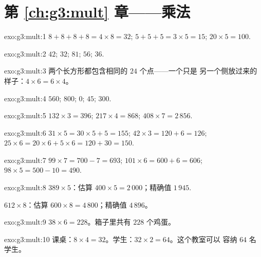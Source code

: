 \section*{第 \ref{ch:g3:mult} 章——乘法}

\begin{solution}{exo:g3:mult:1}
$8 + 8 + 8 + 8 = 4 \times 8 = 32$; \quad
$5 + 5 + 5 = 3 \times 5 = 15$; \quad
$20 \times 5 = 100$.
\end{solution}

\begin{solution}{exo:g3:mult:2}
$42$; \quad $32$; \quad $81$; \quad $56$; \quad $36$.
\end{solution}

\begin{solution}{exo:g3:mult:3}
两个长方形都包含相同的 $24$ 个点——一个只是
另一个侧放过来的样子：$4 \times 6 = 6 \times 4$。
\end{solution}

\begin{solution}{exo:g3:mult:4}
$560$; \quad $800$; \quad $0$; \quad $45$; \quad $300$.
\end{solution}

\begin{solution}{exo:g3:mult:5}
$132 \times 3 = 396$; \quad
$217 \times 4 = 868$; \quad
$408 \times 7 = 2\,856$.
\end{solution}

\begin{solution}{exo:g3:mult:6}
$31 \times 5 = 30 \times 5 + 5 = 155$; \quad
$42 \times 3 = 120 + 6 = 126$; \quad
$25 \times 6 = 20 \times 6 + 5 \times 6 = 120 + 30 = 150$.
\end{solution}

\begin{solution}{exo:g3:mult:7}
$99 \times 7 = 700 - 7 = 693$; \quad
$101 \times 6 = 600 + 6 = 606$; \quad
$98 \times 5 = 500 - 10 = 490$.
\end{solution}

\begin{solution}{exo:g3:mult:8}
$389 \times 5$：估算 $400 \times 5 = 2\,000$；精确值
$1\,945$.

$612 \times 8$：估算 $600 \times 8 = 4\,800$；精确值 $4\,896$。
\end{solution}

\begin{solution}{exo:g3:mult:9}
$38 \times 6 = 228$。箱子里共有 $228$ 个鸡蛋。
\end{solution}

\begin{solution}{exo:g3:mult:10}
课桌：$8 \times 4 = 32$。学生：$32 \times 2 = 64$。这个教室可以
容纳 $64$ 名学生。
\end{solution}

